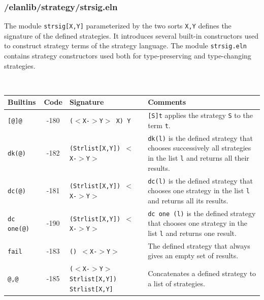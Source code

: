 \subsubsection{/elanlib/strategy/strsig.eln}


The module {\tt strsig[X,Y]} parameterized by the two sorts {\tt X,Y}
defines the signature of the defined strategies.  It introduces several
built-in constructors used to construct strategy terms of the strategy
language.  The module {\tt strsig.eln} contains strategy constructors
used both for type-preserving and type-changing strategies.

~\\
\begin{tabular}{|p{2cm}|c|p{5cm}|p{6cm}|}
\hline
{\bf Builtins} & {\bf Code} & {\bf Signature} & {\bf Comments} \\
\hline
\hline
{\tt [@]@}              & -180 & {\tt ($<$X-$>$Y$>$ X) Y} & {\tt [S]t} applies the strategy {\tt S} to the term {\tt t}.\\
{\tt dk(@)}             & -182 & {\tt (Strlist[X,Y]) $<$X-$>$Y$>$} & {\tt dk(l)} is the defined strategy that chooses successively all strategies in the list {\tt l} and returns all their results.\\
{\tt dc(@)}             & -181 & {\tt (Strlist[X,Y]) $<$X-$>$Y$>$} & {\tt dc(l)} is the defined strategy that chooses one strategy in the list {\tt l} and returns all its results.\\
{\tt dc one(@)}         & -190 & {\tt (Strlist[X,Y]) $<$X-$>$Y$>$} & {\tt dc one (l)} is the defined strategy that chooses one strategy in the list {\tt l} and returns one result.\\
{\tt fail}              & -183 & {\tt () $<$X-$>$Y$>$} & The defined strategy that always gives an empty set of results.\\
{\tt @,@}               & -185 & {\tt ($<$X-$>$Y$>$ Strlist[X,Y]) Strlist[X,Y]} & Concatenates a defined strategy to a list of strategies.\\

\end{tabular}
